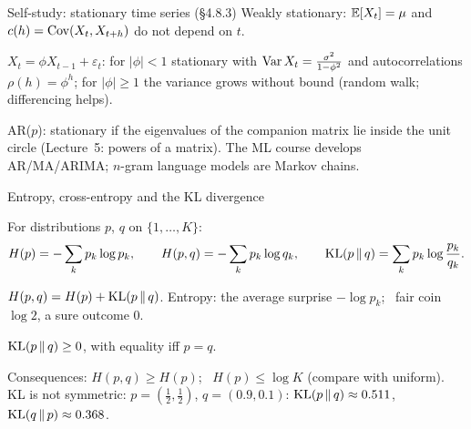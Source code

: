 \documentclass[aspectratio=1610,11pt]{beamer}
\begin{document}
\begin{frame}{Self-study: stationary time series (\S4.8.3)}
    \small
    Weakly stationary: $\mathbb{E}[X_t] = \mu$ and $c(h) = \operatorname{Cov}(X_t, X_{t+h})$ do not depend on $t$.
    \begin{proposition}[AR(1)][prop:ar1]
        \small $X_t = \phi X_{t-1} + \varepsilon_t$: for $|\phi| < 1$ stationary with $\operatorname{Var} X_t = \frac{\sigma^2}{1 - \phi^2}$ and autocorrelations $\rho(h) = \phi^h$; for $|\phi| \geq 1$ the variance grows without bound (random walk; differencing helps).
    \end{proposition}
    AR($p$): stationary if the eigenvalues of the companion matrix lie inside the unit circle (Lecture~5: powers of a matrix). \textcolor{mlcolor}{The ML course develops AR/MA/ARIMA; $n$-gram language models are Markov chains.}
\end{frame}


\begin{frame}{Entropy, cross-entropy and the KL divergence}
    \begin{definition}
        \small For distributions $p$, $q$ on $\{1, \ldots, K\}$:
        \[H(p) = -\sum_kp_k\log p_k, \qquad H(p, q) = -\sum_kp_k\log q_k, \qquad \operatorname{KL}(p \,\|\, q) = \sum_kp_k\log\frac{p_k}{q_k}.\]
    \end{definition}
    \small
    $H(p, q) = H(p) + \operatorname{KL}(p \,\|\, q)$. Entropy: the average surprise $-\log p_k$; \ fair coin $\log 2$, a sure outcome $0$.
    \begin{theorem}
        \small $\operatorname{KL}(p \,\|\, q) \geq 0$, with equality iff $p = q$.
    \end{theorem}
    Consequences: $H(p, q) \geq H(p)$; \ $H(p) \leq \log K$ (compare with uniform). KL is not symmetric: $p = (\frac{1}{2}, \frac{1}{2})$, $q = (0.9, 0.1)$: $\operatorname{KL}(p \,\|\, q) \approx 0.511$, $\operatorname{KL}(q \,\|\, p) \approx 0.368$.
\end{frame}

\end{document}
